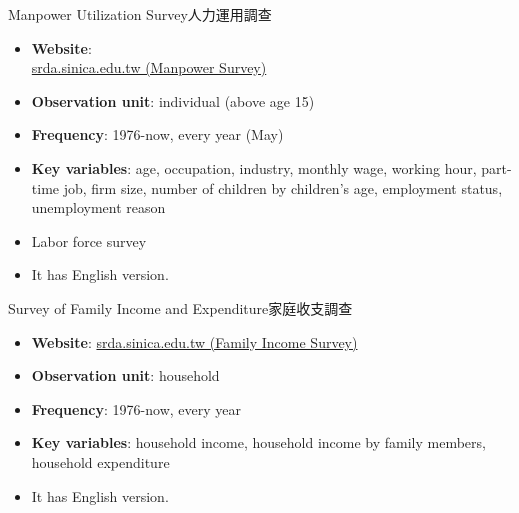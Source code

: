 \documentclass[hyperref={pdfpagelabels=false}]{beamer}
\begin{document}
\begin{frame}{Manpower Utilization Survey}{人力運用調查}
\begin{itemize} 
\item \textbf{Website}: \\ \href{https://srda.sinica.edu.tw/search/metadata/detail/AA020047}{srda.sinica.edu.tw (Manpower Survey)}
\vspace{0.2cm}
\item \textbf{Observation unit}: individual (above age 15)
\vspace{0.2cm}
\item \textbf{Frequency}: 1976-now, every year (May)
\vspace{0.2cm}
\item \textbf{Key variables}: age, occupation, industry, monthly wage, working hour, part-time job, firm size, number of children by children's age, employment status, unemployment reason
\vspace{0.2cm}
\item Labor force survey
\vspace{0.2cm}
\item It has English version. 


\end{itemize}
\end{frame}




\begin{frame}{Survey of Family Income and Expenditure}{家庭收支調查}
\begin{itemize} 
\item \textbf{Website}:  \href{https://srda.sinica.edu.tw/plan/?idx=SRDA.GS016}{srda.sinica.edu.tw (Family Income Survey)}
\vspace{0.2cm}
\item \textbf{Observation unit}: household 
\vspace{0.2cm}
\item \textbf{Frequency}: 1976-now, every year 
\vspace{0.2cm}
\item \textbf{Key variables}: household income, household income by family members, household expenditure
\vspace{0.2cm}
\item It has English version. 


\end{itemize}
\end{frame}
\end{document}
